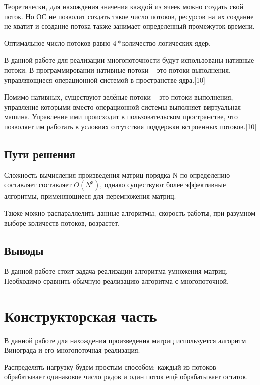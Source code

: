 \documentclass[a4paper,14pt]{article} %
\begin{document}
	Теоретически, для нахождения значения каждой из ячеек можно создать свой поток. Но ОС не позволит создать такое число потоков, ресурсов на их создание не хватит и создание потока также занимает определенный промежуток времени.
	
	Оптимальное число потоков равно $4*\text{количество логических ядер}$.
	
	В данной работе для реализации многопоточности будут использованы нативные потоки. В программировании нативные потоки -- это потоки выполнения, управляющиеся операционной системой в пространстве ядра.[10]
	
	Помимо нативных, существуют зелёные потоки -- это потоки выполнения, управление которыми вместо операционной системы выполняет виртуальная машина. Управление ими происходит в пользовательском пространстве, что позволяет им работать в условиях отсутствия поддержки встроенных потоков.[10]
        	
        \subsection{Пути решения}
        \hfill
        
        Сложность вычисления произведения матриц порядка N по определению составляет составляет $O(N^3)$, однако существуют более эффективные алгоритмы, применяющиеся для перемножения матриц. 
        
	Также можно распараллелить данные алгоритмы, скорость работы, при разумном выборе количеств потоков, возрастет. 
	                
        \subsection{Выводы} 
        \hfill
        
        В данной работе стоит задача реализации алгоритма умножения матриц. Необходимо сравнить обычную реализацию алгоритма с многопоточной. 
           

	\newpage

	\section{Конструкторская часть}
	\hfill
	
	 В данной работе для нахождения произведения матриц используется алгоритм Винограда и его многопоточная реализация.
	 
	Распределять нагрузку будем простым способом: каждый из потоков обрабатывает одинаковое число рядов и один поток ещё обрабатывает остаток.  
	
\end{document}
